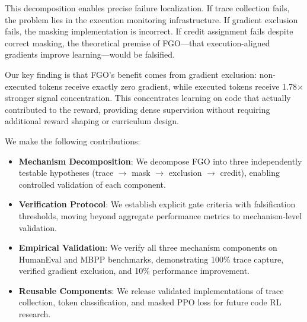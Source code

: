This decomposition enables precise failure localization. If trace collection fails, the problem lies in the execution monitoring infrastructure. If gradient exclusion fails, the masking implementation is incorrect. If credit assignment fails despite correct masking, the theoretical premise of FGO---that execution-aligned gradients improve learning---would be falsified.

Our key finding is that FGO's benefit comes from gradient exclusion: non-executed tokens receive exactly zero gradient, while executed tokens receive 1.78$\times$ stronger signal concentration. This concentrates learning on code that actually contributed to the reward, providing dense supervision without requiring additional reward shaping or curriculum design.

We make the following contributions:

\begin{itemize}
    \item \textbf{Mechanism Decomposition}: We decompose FGO into three independently testable hypotheses (trace $\rightarrow$ mask $\rightarrow$ exclusion $\rightarrow$ credit), enabling controlled validation of each component.

    \item \textbf{Verification Protocol}: We establish explicit gate criteria with falsification thresholds, moving beyond aggregate performance metrics to mechanism-level validation.

    \item \textbf{Empirical Validation}: We verify all three mechanism components on HumanEval and MBPP benchmarks, demonstrating 100\% trace capture, verified gradient exclusion, and 10\% performance improvement.

    \item \textbf{Reusable Components}: We release validated implementations of trace collection, token classification, and masked PPO loss for future code RL research.
\end{itemize}
